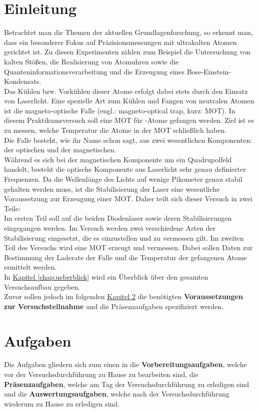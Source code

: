 \documentclass[
class=book,
accentcolor=1b,
custommargins=geometry,
fontsize=11pt,
thesis={type=Versuchsanleitung},
ruledheaders=all,
headline=false,
instbox=false,
marginpar=false,
title=small,
ignore-missing-data=true,
twoside=false,
logofile=apqdesign/tuda_logo.pdf,
pdfa=false %
]{apqpub}
\begin{document}
\chapter{Einleitung}
Betrachtet man die Themen der aktuellen Grundlagenforschung, so erkennt man, dass ein besonderer Fokus auf
Präzisionsmessungen mit ultrakalten Atomen gerichtet ist. Zu diesen Experimenten zählen zum Beispiel die Untersuchung von kalten Stößen, die Realisierung von Atomuhren sowie die Quanteninformationsverarbeitung und
die Erzeugung eines Bose-Einstein-Kondensats.\\
Das Kühlen bzw. Vorkühlen dieser Atome erfolgt dabei stets durch den Einsatz von Laserlicht. Eine spezielle Art
zum Kühlen und Fangen von neutralen Atomen ist die magneto-optische Falle (engl.: magneto-optical trap, kurz: MOT). In
diesem Praktikumsversuch soll eine MOT für -Atome gefangen werden. Ziel ist es zu messen, welche Temperatur die
Atome in der MOT schließlich haben.\\
Die Falle besteht, wie ihr Name schon sagt, aus zwei wesentlichen Komponenten: der optischen und der magnetischen.\\
Während es sich bei der magnetischen Komponente um ein Quadrupolfeld handelt, besteht die optische Komponente
aus Laserlicht sehr genau definierter Frequenzen. Da die Wellenlänge des Lichts auf wenige Pikometer genau stabil
gehalten werden muss, ist die Stabilisierung der Laser eine wesentliche Voraussetzung zur Erzeugung einer MOT.
Daher teilt sich dieser Versuch in zwei Teile:\\
Im ersten Teil soll auf die beiden Diodenlaser sowie deren Stabilisierungen eingegangen werden. Im Versuch werden
zwei verschiedene Arten der Stabilisierung eingesetzt, die es einzustellen und zu vermessen gilt. Im zweiten
Teil des Versuchs wird eine MOT erzeugt und vermessen. Dabei sollen Daten zur Bestimmung der Laderate der
Falle und die Temperatur der gefangenen Atome ermittelt werden.\\
In \hyperref[chap:ueberblick]{Kapitel \ref{chap:ueberblick}} wird ein Überblick über den gesamten Versuchsaufbau gegeben.\\ 
Zuvor sollen jedoch im folgenden \hyperref[chap:aufgaben]{Kapitel \ref{chap:aufgaben}} die benötigten \textbf{Voraussetzungen zur Versuchsteilnahme} und die Präsenzaufgaben spezifiziert werden. 


\chapter{Aufgaben}
\label{chap:aufgaben}
Die Aufgaben gliedern sich zum einen in die \textbf{Vorbereitungsaufgaben}, welche vor der Versuchsdurchführung zu Hause zu bearbeiten sind, die \textbf{Präsenzaufgaben}, welche am Tag der Versuchsdurchführung zu erledigen sind und die \textbf{Auswertungsaufgaben}, welche nach der Versuchsdurchführung wiederum zu Hause zu erledigen sind.\\
\end{document}
